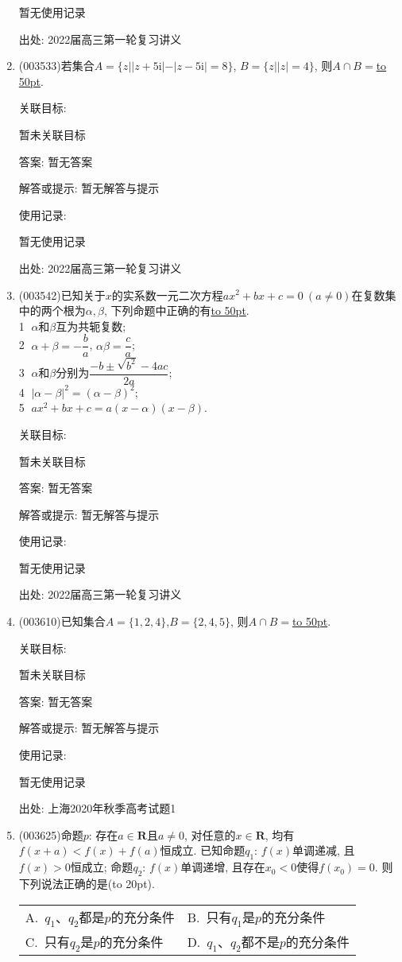 \documentclass[10pt,a4paper]{article}
\newcommand{\blank}[1]{\underline{\hbox to #1pt{}}}
\newcommand{\bracket}[1]{(\hbox to #1pt{})}
\newcommand{\twoch}[4]{\par\begin{tabular}{p{.46\textwidth}p{.46\textwidth}}
A.~#1& B.~#2\\
C.~#3& D.~#4
\end{tabular}}
\begin{document}
\begin{enumerate}[1.]
暂无使用记录


出处: 2022届高三第一轮复习讲义
\item { (003533)}若集合$A=\{z||z+5\mathrm{i}|-|z-5\mathrm{i}|=8\}$, $B=\{z||z|=4\}$, 则$A\cap B=$\blank{50}.


关联目标:

暂未关联目标

答案: 暂无答案

解答或提示: 暂无解答与提示

使用记录:

暂无使用记录


出处: 2022届高三第一轮复习讲义
\item { (003542)}已知关于$x$的实系数一元二次方程$ax^2+bx+c=0\ (a\ne 0)$在复数集中的两个根为$\alpha,\beta$, 下列命题中正确的有\blank{50}.\\
\textcircled{1} $\alpha$和$\beta$互为共轭复数;\\
\textcircled{2} $\alpha +\beta =-\dfrac ba$, $\alpha \beta =\dfrac ca$;\\
\textcircled{3} $\alpha$和$\beta$分别为$\dfrac{-b\pm \sqrt{b^2}-4ac}{2a}$;\\
\textcircled{4} $|\alpha -\beta|^2=(\alpha-\beta)^2$;\\
\textcircled{5} $ax^2+bx+c=a(x-\alpha)(x-\beta)$.


关联目标:

暂未关联目标

答案: 暂无答案

解答或提示: 暂无解答与提示

使用记录:

暂无使用记录


出处: 2022届高三第一轮复习讲义
\item { (003610)}已知集合$A=\{1,2,4\}$,$B=\{2,4,5\}$, 则$A\cap B=$\blank{50}.


关联目标:

暂未关联目标

答案: 暂无答案

解答或提示: 暂无解答与提示

使用记录:

暂无使用记录


出处: 上海2020年秋季高考试题1
\item { (003625)}命题$p$: 存在$a\in \mathbf{R}$且$a\ne 0$, 对任意的$x\in \mathbf{R}$, 均有$f(x+a)<f(x)+f(a)$恒成立. 已知命题$q_1$: $f(x)$单调递减, 且$f(x)>0$恒成立; 命题$q_2$: $f(x)$单调递增, 且存在${x_0}<0$使得$f({x_0})=0$. 则下列说法正确的是\bracket{20}.
\twoch{$q_1$、$q_2$都是$p$的充分条件}{只有$q_1$是$p$的充分条件}{只有$q_2$是$p$的充分条件}{$q_1$、$q_2$都不是$p$的充分条件}



\end{enumerate}
\end{document}
